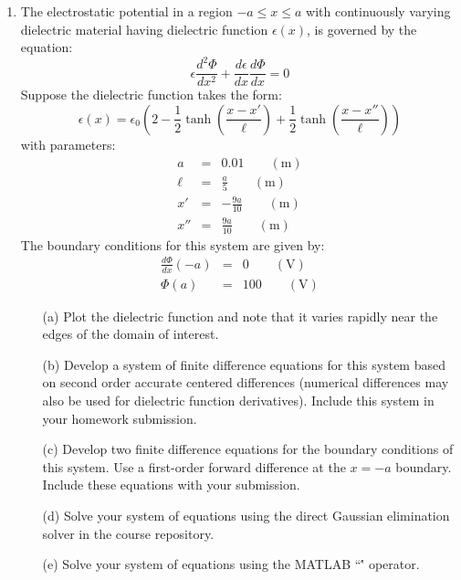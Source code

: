 \documentclass{article}
\begin{document}
\begin{enumerate}
  \item  The electrostatic potential in a region $-a \le x \le a$ with continuously varying dielectric material having dielectric function $\epsilon(x)$, is governed by the equation:  
  \begin{equation}
    \epsilon \frac{d^2 \Phi}{d x^2} + \frac{d \epsilon} {d x} \frac{d \Phi}{d x} = 0 
  \end{equation}
  Suppose the dielectric function takes the form:
  \begin{equation}
    \epsilon(x) = \epsilon_0 \left( 2 - \frac{1}{2} \tanh \left( \frac{x-x'}{\ell}\right) + \frac{1}{2} \tanh \left( \frac{x-x''}{\ell}\right) \right)
  \end{equation} 
  with parameters:
  \begin{eqnarray}
  a &=& 0.01 \qquad (\mathrm{m}) \nonumber \\
  \ell &=& \frac{a}{5} \qquad (\mathrm{m}) \nonumber \\
  x' &=& -\frac{9a}{10} \qquad (\mathrm{m}) \nonumber \\
  x'' &=& \frac{9a}{10} \qquad (\mathrm{m}) \nonumber  
  \end{eqnarray}  
  The boundary conditions for this system are given by:
  \begin{eqnarray}
  \frac{d \Phi}{d x}(-a) &=& 0 \qquad (\mathrm{V}) \nonumber \\
  \Phi(a) &=& 100 \qquad (\mathrm{V}) \nonumber
  \end{eqnarray}     
  \begin{itemize}
    \item[(a)]  Plot the dielectric function and note that it varies rapidly near the edges of the domain of interest.
    \item[(b)]  Develop a system of finite difference equations for this system based on second order accurate centered differences (numerical differences may also be used for dielectric function derivatives).  Include this system in your homework submission.
    \item[(c)]  Develop two finite difference equations for the boundary conditions of this system.  Use a first-order forward difference at the $x=-a$ boundary.  Include these equations with your submission.  
    \item[(d)]  Solve your system of equations using the direct Gaussian elimination solver in the course repository.
    \item[(e)]  Solve your system of equations using the MATLAB ``\'' operator.

\end{itemize}
\end{enumerate}
\end{document}
